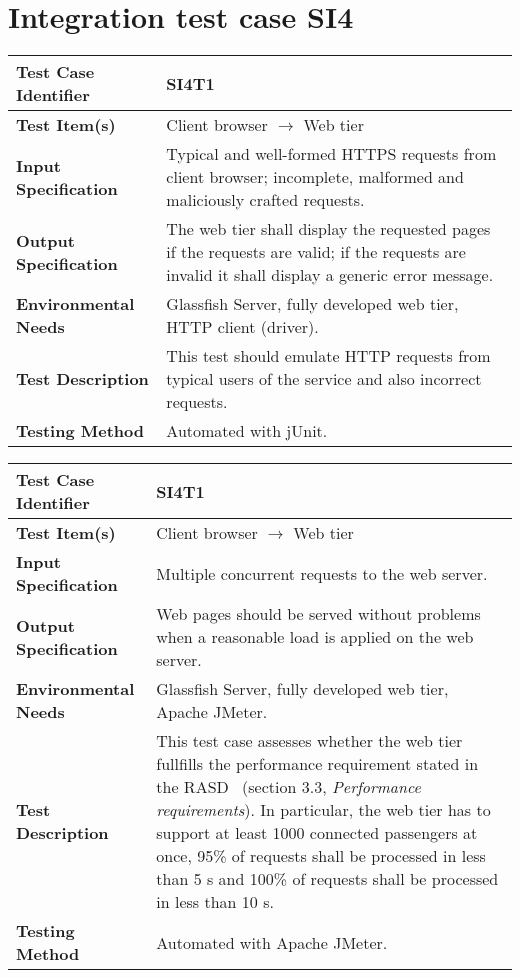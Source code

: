 \vspace{2em}

\section{Integration test case SI4}

\begin{tabular}{l p{}}
    \hline
    \textbf{Test Case Identifier} & SI4T1\\
    \hline
    \textbf{Test Item(s)} & Client browser $\rightarrow$ Web tier\\
    \hline
    \textbf{Input Specification} & Typical and well-formed HTTPS requests from client browser; incomplete, malformed and maliciously crafted requests.\\
    \hline
    \textbf{Output Specification} & The web tier shall display the requested pages if the requests are valid; if the requests are invalid it shall display a generic error message. \\
    \hline
    \textbf{Environmental Needs} & Glassfish Server, fully developed web tier, HTTP client (driver).\\
    \hline
    \textbf{Test Description} & This test should emulate HTTP requests from typical users of the service and also incorrect requests.\\
    \hline
    \textbf{Testing Method} & Automated with jUnit. \\
    \hline
\end{tabular}

\vspace{2em}

\noindent\begin{tabular}{l p{}}
    \hline
    \textbf{Test Case Identifier} & SI4T1\\
    \hline
    \textbf{Test Item(s)} & Client browser $\rightarrow$ Web tier\\
    \hline
    \textbf{Input Specification} & Multiple concurrent requests to the web server.\\
    \hline
    \textbf{Output Specification} & Web pages should be served without problems when a reasonable load is applied on the web server. \\
    \hline
    \textbf{Environmental Needs} & Glassfish Server, fully developed web tier, Apache JMeter.\\
    \hline
    \textbf{Test Description} & This test case assesses whether the web tier fullfills the performance requirement stated in the RASD~\cite{mytaxi-rasd} (section 3.3, \emph{Performance requirements}). In particular, the web tier has to support at least 1000 connected passengers at once, 95\% of requests shall be processed in less than 5 s and 100\% of requests shall be processed in less than 10 s.\\
    \hline
    \textbf{Testing Method} & Automated with Apache JMeter. \\
    \hline
\end{tabular}

